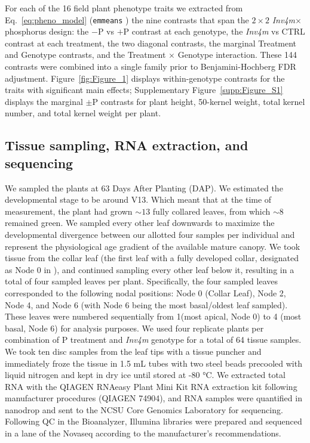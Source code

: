 \documentclass[9pt,twocolumn,twoside]{rilabRxiv}
\newcommand{\invfour}{\textit{Inv4m}\xspace}
\begin{document}
For each of the 16 field plant phenotype traits we extracted from Eq.~\ref{eq:pheno_model} (\texttt{emmeans} \cite{lenth2023}) the nine contrasts that span the $2 \times 2$ \invfour $\times$ phosphorus design: the $-$P vs $+$P contrast at each genotype, the \invfour vs CTRL contrast at each treatment, the two diagonal contrasts, the marginal Treatment and Genotype contrasts, and the Treatment $\times$ Genotype interaction. These 144 contrasts were combined into a single family prior to Benjamini-Hochberg FDR adjustment.
Figure~\ref{fig:Figure_1} displays within-genotype contrasts for the traits with significant main effects; Supplementary Figure~\ref{supp:Figure_S1} displays the marginal $\pm$P contrasts for plant height, 50-kernel weight, total kernel number, and total kernel weight per plant.

\subsection*{Tissue sampling, RNA extraction, and sequencing}

We sampled the plants at 63 Days After Planting ($\text{DAP}$).
We estimated the developmental stage to be around V13. Which meant that at the time of measurement, the plant had grown $\sim 13$ fully collared leaves, from which $\sim 8$ remained green.
We sampled every other leaf downwards to maximize the developmental divergence between our allotted four samples per individual and represent the physiological age gradient of the available mature canopy.
We took tissue from the collar leaf (the first leaf with a fully developed collar, designated as Node 0 in \cite{ciganda2008}), and continued sampling every other leaf below it, resulting in a total of four sampled leaves per plant.
Specifically, the four sampled leaves corresponded to the following nodal positions: Node 0 (Collar Leaf), Node 2, Node 4, and Node 6 (with Node 6 being the most basal/oldest leaf sampled). These leaves were numbered sequentially from 1(most apical, Node 0) to  4 (most basal, Node 6) for analysis purposes. 
We used four replicate plants per combination of  P treatment and \invfour genotype for a total of 64 tissue samples. 
We took ten disc samples from the leaf tips with a tissue puncher and immediately froze the tissue in 1.5 mL tubes with two steel beads precooled with liquid nitrogen and kept in dry ice until stored at -80 °C.
We extracted total RNA with the QIAGEN RNAeasy Plant Mini Kit  RNA extraction kit following manufacturer procedures (QIAGEN 74904), and RNA samples were quantified in nanodrop and sent to the NCSU Core Genomics Laboratory for sequencing.
Following QC in the Bioanalyzer, Illumina libraries were prepared and sequenced in a lane of the Novaseq according to the manufacturer's recommendations.
\end{document}
